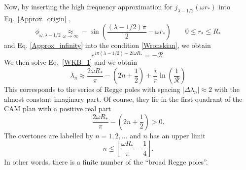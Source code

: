 \documentclass[aps,prd,longbibliography,reprint,twocolumn,amsmath,amssymb,amsfonts,showpacs,superscriptaddress]{revtex4-1}%
\begin{document}
Now, by inserting the high frequency approximation for $j_{\lambda-1/2} (\omega r_*)$ into Eq.~\eqref{Approx_origin} \cite{nist},
\begin{equation}\label{Approx_origin_bis}
  \phi^{}_{\omega,\lambda-1/2} \underset{\omega \to \infty}{\approx} - \sin\left(\frac{\left(\lambda-1/2\right)\pi}{2}-\omega r_*\right)\quad\quad 0\leq r_*\leq R_*
\end{equation}
and Eq. \eqref{Approx_infinity} into the condition  \eqref{Wronskian}, we obtain
\begin{equation}\label{WKB_1}
   e^{ i\pi (\lambda-1/2)- 2 i \omega R_*}=-\mathcal{R}.
\end{equation}
%
We then solve Eq.~\eqref{WKB_1} and we obtain
\begin{equation}\label{lambda_Approx}
  \lambda_n \approx \frac{2 \omega R_*}{\pi}-\left(2n+\frac{1}{2}\right)+\frac{i}{\pi} \ln\left(\frac{1}{\mathcal{R}}\right)
\end{equation}
This corresponds to the series of Regge poles with spacing $|\Delta \lambda_n|\approx 2$ with the almost constant  imaginary part. Of course, they lie in the first quadrant of the CAM plan with a positive real part
%
\begin{equation}\label{Real_Part}
  \frac{2 \omega R_*}{\pi}-\left(2n+\frac{1}{2}\right)>0.
\end{equation}
%
The overtones are labelled by $n =1,2,\ldots$ and $n$ has an upper limit
%
\begin{equation}\label{Limit_Broad_RP}
n \leq \left\lfloor \frac{\omega R_*}{\pi} - \frac{1}{4}\right\rfloor.
\end{equation}
%
In other words, there is a finite number of the ``broad Regge poles''.

\end{document}
